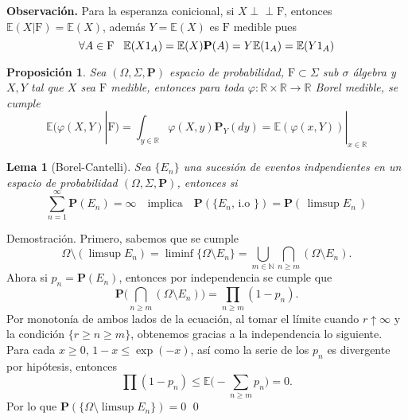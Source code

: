 \documentclass[letterpaper]{book}
\newcommand{\ind}{\perp\!\!\!\!\perp}
\newtheorem{prop}[teorema]{Proposici\'on}
\newtheorem{lema}[teorema]{Lema}
\newcommand{\nat}{\ensuremath{ \mathbb N }}
\newcommand{\prob}{\textbf{P}}
\newcommand{\esp}{\mathbb E}
\newcommand{\obs}{{\newline \noindent \sc \textbf{Observación. }}}
\newcommand{\dem}{{\noindent \sc Demostraci\'on. }}
\newcommand{\om}{\ensuremath{\Omega}}
\newcommand{\sig}{\ensuremath{\Sigma}}
\newcommand{\re}{\ensuremath{\mathbb R }}
\begin{document}
\obs Para la esperanza conicional, si \(X \ind\mathrm{F}\), entonces \(\esp(X|\mathrm{F})=\esp(X)\), además \(Y=\esp(X)\) es \(\mathrm{F}\) medible pues
\[
    \forall A\in\mathrm{F}\hspace{0.3cm}\esp(X1_A)=\esp(X)\prob(A)=Y\esp(1_A)=\esp(Y1_A)
\]
\begin{prop}
Sea $(\om,\sig,\prob)$ espacio de probabilidad, $\mathrm{F}\subset\sig$ sub $\sigma$ álgebra y $X,Y$  tal que $X$ sea $\mathrm{F}$ medible, entonces para toda $\varphi:\re\times\re\rightarrow\re$ Borel medible, se cumple
\[
\esp(\varphi(X,Y)|\mathrm{F})=\int_{y\in\re}\varphi(X,y)\prob_Y(dy)=\esp(\varphi(x,Y))|_{x\in\re}
\]
\end{prop}
\begin{lema}[Borel-Cantelli]\label{bor-can}
Sea $\{E_n\}$ una sucesión de eventos indpendientes en un espacio de probabilidad $(\om,\sig,\prob)$, entonces si
\begin{equation}
\sum_{n=1}^{\infty}\prob(E_n)=\infty\quad\text{implica}\quad\prob(\{E_n,\,\text{i.o }\})=\prob(\,\limsup E_n\,)
\end{equation}
\end{lema}
\dem Primero, sabemos que se cumple
\[
    \om\setminus(\limsup E_n)=\liminf \{\om\setminus E_n\}=\bigcup_{m\in\nat}\bigcap_{n\geq m}(\om\setminus E_n).
\]
\noindent Ahora si \(p_n=\prob(E_n)\), entonces por independencia se cumple que
\[
    \prob\Big(\bigcap_{n\geq m}(\om\setminus E_n)\Big)=\prod_{n\geq m}(1-p_n).
\]
Por monotonía de ambos lados de la ecuación, al tomar el límite cuando \(r\uparrow\infty\) y la condición \(\{r\geq n\geq m\}\), obtenemos gracias a la independencia lo siguiente. Para cada \(x\geq 0\), \(1-x\leq\exp(-x)\), así como la serie de los \(p_n\) es divergente por hipótesis, entonces
\[
    \prod(1-p_n)\leq\esp\Big(-\sum_{n\geq m}p_n\Big)=0.
\]
\noindent Por lo que \(\prob(\{\om\setminus\limsup E_n\})=0\) \qed
\end{document}
